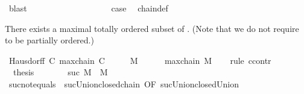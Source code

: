 \begin{isabellebody}
\ blast\isanewline
\ \ \ \ \ \ \isamarkupfalse%
\isanewline
\ \ \ \ \isamarkupfalse%
\isanewline
\ \ \isamarkupfalse%
\isanewline
\ \ \isamarkupfalse%
\ \isamarkupfalse%
\ {\isacharquery}{\kern0pt}case\ \isamarkupfalse%
\ chain{\isacharunderscore}{\kern0pt}def\ \isacommand{{\isachardot}{\kern0pt}{\isachardot}{\kern0pt}}\isamarkupfalse%
\isanewline
{}\isamarkupfalse%
%
\endisatagproof
{\isafoldproof}%
%
\isadelimproof
%
\endisadelimproof
%
\isadelimdocument
%
\endisadelimdocument
%
\isatagdocument
%
\isamarkuptrue%
%
\endisatagdocument
{\isafolddocument}%
%
\isadelimdocument
%
\endisadelimdocument
%
\begin{isamarkuptext}%
There exists a maximal totally ordered subset of . (Note that we do not
  require  to be partially ordered.)%
\end{isamarkuptext}\isamarkuptrue%
\isamarkupfalse%
\ Hausdorff{\isacharcolon}{\kern0pt}\ {\isachardoublequoteopen}{\isasymexists}C{\isachardot}{\kern0pt}\ maxchain\ C{\isachardoublequoteclose}\isanewline
%
\isadelimproof
%
\endisadelimproof
%
\isatagproof
{}\isamarkupfalse%
\ {\isacharminus}{\kern0pt}\isanewline
\ \ \isamarkupfalse%
\ {\isacharquery}{\kern0pt}M\ {\isacharequal}{\kern0pt}\ {\isachardoublequoteopen}{\isasymUnion}{\isasymC}{\isachardoublequoteclose}\isanewline
\ \ \isamarkupfalse%
\ {\isachardoublequoteopen}maxchain\ {\isacharquery}{\kern0pt}M{\isachardoublequoteclose}\isanewline
\ \ \isamarkupfalse%
\ {\isacharparenleft}{\kern0pt}rule\ ccontr{\isacharparenright}{\kern0pt}\isanewline
\ \ \ \ \isamarkupfalse%
\ {\isachardoublequoteopen}{\isasymnot}\ {\isacharquery}{\kern0pt}thesis{\isachardoublequoteclose}\isanewline
\ \ \ \ \isamarkupfalse%
\ \isamarkupfalse%
\ {\isachardoublequoteopen}suc\ {\isacharquery}{\kern0pt}M\ {\isasymnoteq}\ {\isacharquery}{\kern0pt}M{\isachardoublequoteclose}\isanewline
\ \ \ \ \ \ \isamarkupfalse%
\ suc{\isacharunderscore}{\kern0pt}not{\isacharunderscore}{\kern0pt}equals\ \ suc{\isacharunderscore}{\kern0pt}Union{\isacharunderscore}{\kern0pt}closed{\isacharunderscore}{\kern0pt}chain\ {\isacharbrackleft}{\kern0pt}OF\ suc{\isacharunderscore}{\kern0pt}Union{\isacharunderscore}{\kern0pt}closed{\isacharunderscore}{\kern0pt}Union{\isacharbrackright}{\kern0pt}\ \isamarkupfalse%

\end{isabellebody}
